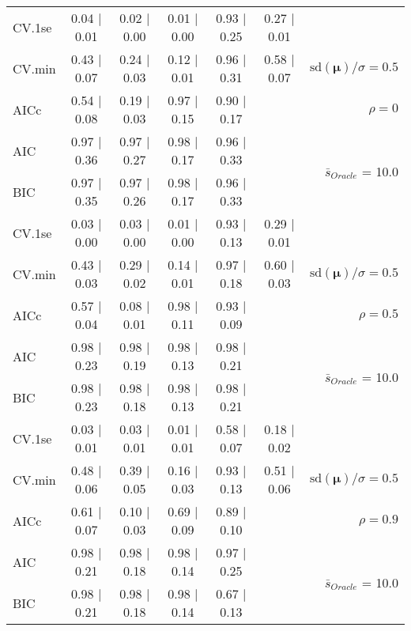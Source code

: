 \begin{table}
\begin{center}
\begin{tabular}{l*{5}{c}|r}
 \hline 
CV.1se & 0.04 $\mid$ 0.01 & 0.02 $\mid$ 0.00 & 0.01 $\mid$ 0.00 & 0.93 $\mid$ 0.25 & 0.27 $\mid$ 0.01 & \\
CV.min & 0.43 $\mid$ 0.07 & 0.24 $\mid$ 0.03 & 0.12 $\mid$ 0.01 & 0.96 $\mid$ 0.31 & 0.58 $\mid$ 0.07 &  $\mathrm{sd}(\mathbf{\mu})/\sigma=0.5$ \\
AICc & 0.54 $\mid$ 0.08 & 0.19 $\mid$ 0.03 & 0.97 $\mid$ 0.15 & 0.90 $\mid$ 0.17 & & $\rho=0$ \\
AIC & 0.97 $\mid$ 0.36 & 0.97 $\mid$ 0.27 & 0.98 $\mid$ 0.17 & 0.96 $\mid$ 0.33 & &  \multirow{2}{*}{$\bar{s}_{Oracle}$ = 10.0} \\
BIC & 0.97 $\mid$ 0.35 & 0.97 $\mid$ 0.26 & 0.98 $\mid$ 0.17 & 0.96 $\mid$ 0.33 & &  \\
 \hline 
CV.1se & 0.03 $\mid$ 0.00 & 0.03 $\mid$ 0.00 & 0.01 $\mid$ 0.00 & 0.93 $\mid$ 0.13 & 0.29 $\mid$ 0.01 & \\
CV.min & 0.43 $\mid$ 0.03 & 0.29 $\mid$ 0.02 & 0.14 $\mid$ 0.01 & 0.97 $\mid$ 0.18 & 0.60 $\mid$ 0.03 &  $\mathrm{sd}(\mathbf{\mu})/\sigma=0.5$ \\
AICc & 0.57 $\mid$ 0.04 & 0.08 $\mid$ 0.01 & 0.98 $\mid$ 0.11 & 0.93 $\mid$ 0.09 & & $\rho=0.5$ \\
AIC & 0.98 $\mid$ 0.23 & 0.98 $\mid$ 0.19 & 0.98 $\mid$ 0.13 & 0.98 $\mid$ 0.21 & &  \multirow{2}{*}{$\bar{s}_{Oracle}$ = 10.0} \\
BIC & 0.98 $\mid$ 0.23 & 0.98 $\mid$ 0.18 & 0.98 $\mid$ 0.13 & 0.98 $\mid$ 0.21 & &  \\
 \hline 
CV.1se & 0.03 $\mid$ 0.01 & 0.03 $\mid$ 0.01 & 0.01 $\mid$ 0.01 & 0.58 $\mid$ 0.07 & 0.18 $\mid$ 0.02 & \\
CV.min & 0.48 $\mid$ 0.06 & 0.39 $\mid$ 0.05 & 0.16 $\mid$ 0.03 & 0.93 $\mid$ 0.13 & 0.51 $\mid$ 0.06 &  $\mathrm{sd}(\mathbf{\mu})/\sigma=0.5$ \\
AICc & 0.61 $\mid$ 0.07 & 0.10 $\mid$ 0.03 & 0.69 $\mid$ 0.09 & 0.89 $\mid$ 0.10 & & $\rho=0.9$ \\
AIC & 0.98 $\mid$ 0.21 & 0.98 $\mid$ 0.18 & 0.98 $\mid$ 0.14 & 0.97 $\mid$ 0.25 & &  \multirow{2}{*}{$\bar{s}_{Oracle}$ = 10.0} \\
BIC & 0.98 $\mid$ 0.21 & 0.98 $\mid$ 0.18 & 0.98 $\mid$ 0.14 & 0.67 $\mid$ 0.13 & &  \\
 \hline 
\end{tabular}
\end{center}
\vspace{-1cm}
\end{table}




